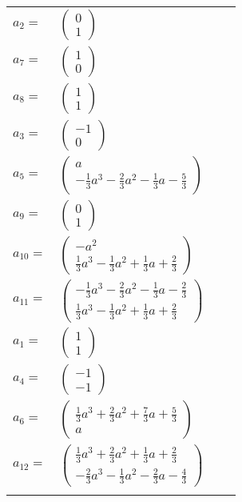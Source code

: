\documentclass[1p]{elsarticle_modified}
\theoremstyle{definition}
\begin{document}
\begin{tabular}{m{7pt} m{180pt} m{7pt} m{180pt} }
\flushright $a_{2}=$&$\begin{pmatrix}0\\1\end{pmatrix}$ \\
\flushright $a_{7}=$&$\begin{pmatrix}1\\0\end{pmatrix}$ \\
\flushright $a_{8}=$&$\begin{pmatrix}1\\1\end{pmatrix}$ \\
\flushright $a_{3}=$&$\begin{pmatrix}-1\\0\end{pmatrix}$ \\
\flushright $a_{5}=$&$\begin{pmatrix}a\\-\frac{1}{3} a^3-\frac{2}{3} a^2-\frac{1}{3} a-\frac{5}{3}\end{pmatrix}$ \\
\flushright $a_{9}=$&$\begin{pmatrix}0\\1\end{pmatrix}$ \\
\flushright $a_{10}=$&$\begin{pmatrix}- a^2\\\frac{1}{3} a^3-\frac{1}{3} a^2+\frac{1}{3} a+\frac{2}{3}\end{pmatrix}$ \\
\flushright $a_{11}=$&$\begin{pmatrix}-\frac{1}{3} a^3-\frac{2}{3} a^2-\frac{1}{3} a-\frac{2}{3}\\\frac{1}{3} a^3-\frac{1}{3} a^2+\frac{1}{3} a+\frac{2}{3}\end{pmatrix}$ \\
\flushright $a_{1}=$&$\begin{pmatrix}1\\1\end{pmatrix}$ \\
\flushright $a_{4}=$&$\begin{pmatrix}-1\\-1\end{pmatrix}$ \\
\flushright $a_{6}=$&$\begin{pmatrix}\frac{1}{3} a^3+\frac{2}{3} a^2+\frac{7}{3} a+\frac{5}{3}\\a\end{pmatrix}$ \\
\flushright $a_{12}=$&$\begin{pmatrix}\frac{1}{3} a^3+\frac{2}{3} a^2+\frac{1}{3} a+\frac{2}{3}\\-\frac{2}{3} a^3-\frac{1}{3} a^2-\frac{2}{3} a-\frac{4}{3}\end{pmatrix}$\\&\end{tabular}
\end{document}
